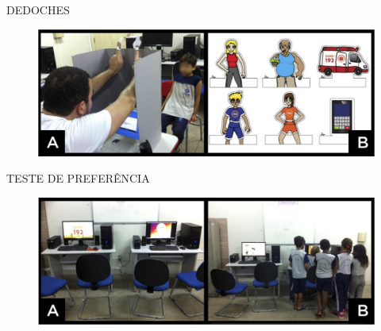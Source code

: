 \documentclass{Alexandre}
\begin{document}
\begin{frame}{DEDOCHES}
    
    \begin{figure}
        \includegraphics[scale = 0.25]{Figuras/Dedoches.jpg}
    \end{figure}

\end{frame}


\begin{frame}{TESTE DE PREFERÊNCIA}
    
    \begin{figure}
        \includegraphics[scale = 0.25]{Figuras/Preferencia.jpg}
    \end{figure}

\end{frame}
\end{document}
